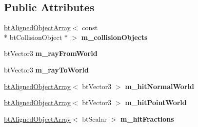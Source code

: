 \subsection*{Public Attributes}
\begin{DoxyCompactItemize}
\item 
\hypertarget{structbt_collision_world_1_1_all_hits_ray_result_callback_a88f8f48d21057e7cc9ba50a1d9a97935}{\hyperlink{classbt_aligned_object_array}{bt\+Aligned\+Object\+Array}$<$ const \\*
bt\+Collision\+Object $\ast$ $>$ {\bfseries m\+\_\+collision\+Objects}}\label{structbt_collision_world_1_1_all_hits_ray_result_callback_a88f8f48d21057e7cc9ba50a1d9a97935}

\item 
\hypertarget{structbt_collision_world_1_1_all_hits_ray_result_callback_ac8a1a6c242d9aa153df571e9d87e86ac}{bt\+Vector3 {\bfseries m\+\_\+ray\+From\+World}}\label{structbt_collision_world_1_1_all_hits_ray_result_callback_ac8a1a6c242d9aa153df571e9d87e86ac}

\item 
\hypertarget{structbt_collision_world_1_1_all_hits_ray_result_callback_a08624d7ca9e0c24decd0b3697293cc03}{bt\+Vector3 {\bfseries m\+\_\+ray\+To\+World}}\label{structbt_collision_world_1_1_all_hits_ray_result_callback_a08624d7ca9e0c24decd0b3697293cc03}

\item 
\hypertarget{structbt_collision_world_1_1_all_hits_ray_result_callback_af8bc1ab14cdda90615ff7e560afc87c0}{\hyperlink{classbt_aligned_object_array}{bt\+Aligned\+Object\+Array}$<$ bt\+Vector3 $>$ {\bfseries m\+\_\+hit\+Normal\+World}}\label{structbt_collision_world_1_1_all_hits_ray_result_callback_af8bc1ab14cdda90615ff7e560afc87c0}

\item 
\hypertarget{structbt_collision_world_1_1_all_hits_ray_result_callback_ada5371cede268c981817c3a72a6ae090}{\hyperlink{classbt_aligned_object_array}{bt\+Aligned\+Object\+Array}$<$ bt\+Vector3 $>$ {\bfseries m\+\_\+hit\+Point\+World}}\label{structbt_collision_world_1_1_all_hits_ray_result_callback_ada5371cede268c981817c3a72a6ae090}

\item 
\hypertarget{structbt_collision_world_1_1_all_hits_ray_result_callback_ab1d9107e78b4a06e70c803e32406ec54}{\hyperlink{classbt_aligned_object_array}{bt\+Aligned\+Object\+Array}$<$ bt\+Scalar $>$ {\bfseries m\+\_\+hit\+Fractions}}\label{structbt_collision_world_1_1_all_hits_ray_result_callback_ab1d9107e78b4a06e70c803e32406ec54}

\end{DoxyCompactItemize}


